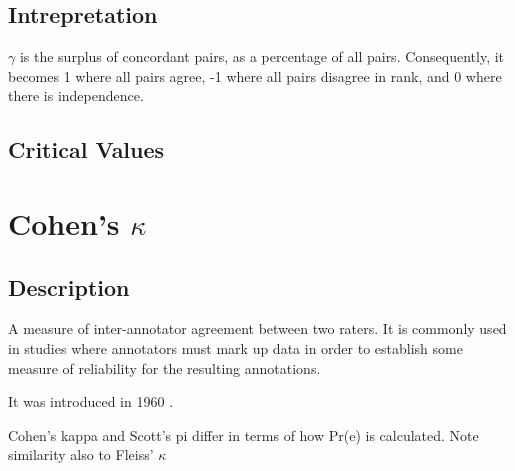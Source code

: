 \documentclass[11pt]{article}
\begin{document}
\subsection{Intrepretation}
$\gamma$ is the surplus of concordant pairs, as a percentage of all pairs.  Consequently, it becomes 1 where all pairs agree, -1 where all pairs disagree in rank, and 0 where there is independence.

\subsection{Critical Values}






\section{Cohen's $\kappa$} %
\subsection{Description}
A measure of inter-annotator agreement between two raters.  It is commonly used in studies where annotators must mark up data in order to establish some measure of reliability for the resulting annotations.

It was introduced in 1960 \cite{cohen1960coefficient}.

Cohen's kappa and Scott's pi differ in terms of how Pr(e) is calculated.  Note similarity also to Fleiss' $\kappa$ %

\end{document}

